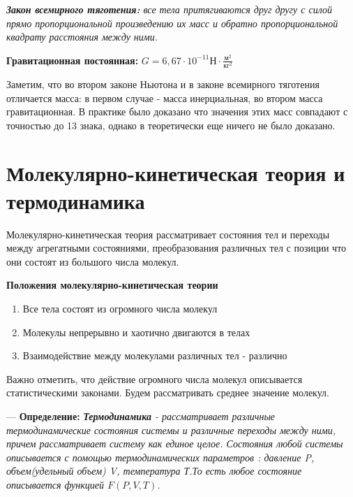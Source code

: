 \documentclass[12pt,a4paper]{report}
\begin{document}
\vspace{5px}

\textit{\textbf{Закон всемирного тяготения: }все тела притягиваются друг другу с силой прямо пропорциональной произведению их масс и обратно пропорциональной квадрату расстояния между ними.}

\vspace{5px}

\textbf{Гравитационная постоянная: }$G = 6,67 \cdot 10^{-11} \text{Н} \cdot \frac{\text{м}^2}{\text{кг}^2}$

\vspace{5px}

Заметим, что во втором законе Ньютона и в законе всемирного тяготения отличается масса: в первом случае - масса инерциальная, во втором масса гравитационная. В практике было доказано что значения этих масс совпадают с точностью до 13 знака, однако в теоретически еще ничего не было доказано.


\chapter{Молекулярно-кинетическая теория и термодинамика}
Молекулярно-кинетическая теория рассматривает состояния тел и переходы между агрегатными состояниями, преобразования различных тел с позиции что они состоят из большого числа молекул.

\vspace{5px}

\textbf{Положения молекулярно-кинетическая теории}
\begin{enumerate}
    \item Все тела состоят из огромного числа молекул
    \item Молекулы непрерывно и хаотично двигаются в телах
    \item Взаимодействие между молекулами различных тел - различно
\end{enumerate}
Важно отметить, что действие огромного числа молекул описывается статистическими законами. Будем рассматривать среднее значение молекул.

\vspace{5px}

--- \textbf{Определение:} \textit{\textbf{Термодинамика} - рассматривает различные термодинамические состояния системы и различные переходы между ними, причем рассматривает систему как единое целое. Состояния любой системы описывается с помощью термодинамических параметров : давление P, объем(удельный объем) V, температура Т.То есть любое состояние описывается функцией $F(P, V, T)$. }
\end{document}
